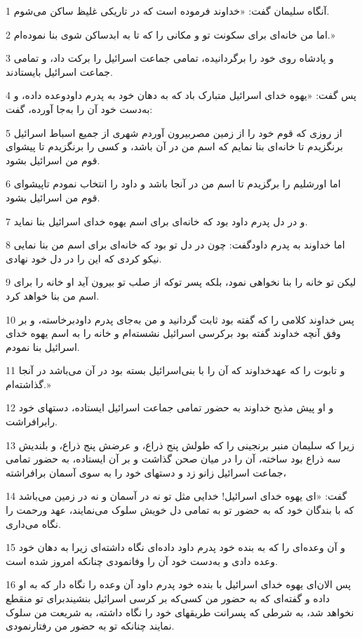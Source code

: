 \par 1 آنگاه سلیمان گفت: «خداوند فرموده است که در تاریکی غلیظ ساکن می‌شوم.
\par 2 اما من خانه‌ای برای سکونت تو و مکانی را که تا به ابدساکن شوی بنا نموده‌ام.»
\par 3 و پادشاه روی خود را برگردانیده، تمامی جماعت اسرائیل را برکت داد، و تمامی جماعت اسرائیل بایستادند.
\par 4 پس گفت: «یهوه خدای اسرائیل متبارک باد که به دهان خود به پدرم داودوعده داده، و به‌دست خود آن را به‌جا آورده، گفت:
\par 5 از روزی که قوم خود را از زمین مصربیرون آوردم شهری از جمیع اسباط اسرائیل برنگزیدم تا خانه‌ای بنا نمایم که اسم من در آن باشد، و کسی را برنگزیدم تا پیشوای قوم من اسرائیل بشود.
\par 6 اما اورشلیم را برگزیدم تا اسم من در آنجا باشد و داود را انتخاب نمودم تاپیشوای قوم من اسرائیل بشود.
\par 7 و در دل پدرم داود بود که خانه‌ای برای اسم یهوه خدای اسرائیل بنا نماید.
\par 8 اما خداوند به پدرم داودگفت: چون در دل تو بود که خانه‌ای برای اسم من بنا نمایی نیکو کردی که این را در دل خود نهادی.
\par 9 لیکن تو خانه را بنا نخواهی نمود، بلکه پسر توکه از صلب تو بیرون آید او خانه را برای اسم من بنا خواهد کرد.
\par 10 پس خداوند کلامی را که گفته بود ثابت گردانید و من به‌جای پدرم داودبرخاسته، و بر وفق آنچه خداوند گفته بود برکرسی اسرائیل نشسته‌ام و خانه را به اسم یهوه خدای اسرائیل بنا نمودم.
\par 11 و تابوت را که عهدخداوند که آن را با بنی‌اسرائیل بسته بود در آن می‌باشد در آنجا گذاشته‌ام.»
\par 12 و او پیش مذبح خداوند به حضور تمامی جماعت اسرائیل ایستاده، دستهای خود رابرافراشت.
\par 13 زیرا که سلیمان منبر برنجینی را که طولش پنج ذراع، و عرضش پنج ذراع، و بلندیش سه ذراع بود ساخته، آن را در میان صحن گذاشت و بر آن ایستاده، به حضور تمامی جماعت اسرائیل زانو زد و دستهای خود را به سوی آسمان برافراشته،
\par 14 گفت: «ای یهوه خدای اسرائیل! خدایی مثل تو نه در آسمان و نه در زمین می‌باشد که با بندگان خود که به حضور تو به تمامی دل خویش سلوک می‌نمایند، عهد ورحمت را نگاه می‌داری.
\par 15 و آن وعده‌ای را که به بنده خود پدرم داود داده‌ای نگاه داشته‌ای زیرا به دهان خود وعده دادی و به‌دست خود آن را وفانمودی چنانکه امروز شده است.
\par 16 پس الان‌ای یهوه خدای اسرائیل با بنده خود پدرم داود آن وعده را نگاه دار که به او داده و گفته‌ای که به حضور من کسی‌که بر کرسی اسرائیل بنشیندبرای تو منقطع نخواهد شد، به شرطی که پسرانت طریقهای خود را نگاه داشته، به شریعت من سلوک نمایند چنانکه تو به حضور من رفتارنمودی.
